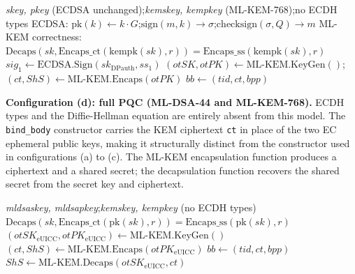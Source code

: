 \documentclass[a4paper,fleqn]{cas-sc}
\begin{document}
\begin{algorithm}[H]
\caption{Config (c): ECDSA + ML-KEM-768}
\footnotesize
\begin{algorithmic}[1]
\Statex \textit{skey, pkey} (ECDSA unchanged);\enspace \textit{kemskey, kempkey} (ML-KEM-768);\enspace no ECDH types
\State ECDSA: $\mathrm{pk}(k)\gets k{\cdot}G$;\enspace $\mathrm{sign}(m,k)\to\sigma$;\enspace $\mathrm{checksign}(\sigma,Q)\to m$
\State ML-KEM correctness: $\mathrm{Decaps}(\mathit{sk},\mathrm{Encaps\_ct}(\mathrm{kempk}(\mathit{sk}),r))=\mathrm{Encaps\_ss}(\mathrm{kempk}(\mathit{sk}),r)$
\State $\mathit{sig}_1\gets\text{ECDSA.Sign}(\mathit{sk}_{\mathrm{DPauth}},\mathit{ss}_1)$ 
\State $(\mathit{otSK},\mathit{otPK})\gets\text{ML-KEM.KeyGen}()$;\enspace $(\mathit{ct},\mathit{ShS})\gets\text{ML-KEM.Encaps}(\mathit{otPK})$ 
\State $\mathit{bb}\gets(\mathit{tid},\mathit{ct},\mathit{bpp})$ 
\end{algorithmic}
\end{algorithm}

\noindent\textbf{Configuration (d): full PQC (ML-DSA-44 and ML-KEM-768).}
ECDH types and the Diffie-Hellman equation are entirely absent from this
model. The \texttt{bind\_body} constructor carries the KEM ciphertext
\texttt{ct} in place of the two EC ephemeral public keys, making it
structurally distinct from the constructor used in configurations (a)
to (c). The ML-KEM encapsulation function produces a ciphertext and
a shared secret; the decapsulation function recovers the shared secret
from the secret key and ciphertext.

\begin{algorithm}[H]
\caption{Config (d): ML-DSA-44 + ML-KEM-768 (full PQC)}
\footnotesize
\begin{algorithmic}[1]
\Statex \textit{mldsaskey, mldsapkey};\enspace \textit{kemskey, kempkey} (no ECDH types)
\State $\mathrm{Decaps}(\mathit{sk},\mathrm{Encaps\_ct}(\mathrm{pk}(\mathit{sk}),r))=\mathrm{Encaps\_ss}(\mathrm{pk}(\mathit{sk}),r)$ 
\State $(\mathit{otSK}_{\mathrm{eUICC}},\mathit{otPK}_{\mathrm{eUICC}})\gets\text{ML-KEM.KeyGen}()$ 
\State $(\mathit{ct},\mathit{ShS})\gets\text{ML-KEM.Encaps}(\mathit{otPK}_{\mathrm{eUICC}})$ 
\State $\mathit{bb}\gets(\mathit{tid},\mathit{ct},\mathit{bpp})$ 
\State $\mathit{ShS}\gets\text{ML-KEM.Decaps}(\mathit{otSK}_{\mathrm{eUICC}},\mathit{ct})$ 
\end{algorithmic}
\end{algorithm}
\end{document}
